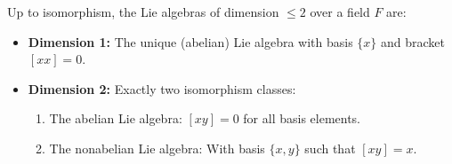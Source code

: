 Up to isomorphism, the Lie algebras of dimension $\leq 2$ over a field $F$ are:

\begin{itemize}
\item \textbf{Dimension 1:} The unique (abelian) Lie algebra with basis $\{x\}$ and bracket $[x x] = 0$.

\item \textbf{Dimension 2:} Exactly two isomorphism classes:
  \begin{enumerate}
  \item The abelian Lie algebra: $[x y] = 0$ for all basis elements.
  \item The nonabelian Lie algebra: With basis $\{x, y\}$ such that $[x y] = x$.
  \end{enumerate}
\end{itemize}

